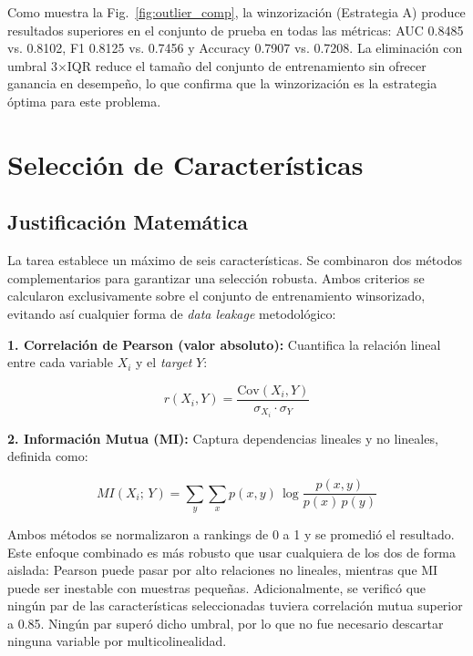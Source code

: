 \documentclass[conference]{IEEEtran}
\begin{document}
Como muestra la Fig.~\ref{fig:outlier_comp}, la winzorizaci\'{o}n (Estrategia A) produce resultados superiores en el conjunto de prueba en todas las m\'{e}tricas: AUC 0.8485 vs. 0.8102, F1 0.8125 vs. 0.7456 y Accuracy 0.7907 vs. 0.7208. La eliminaci\'{o}n con umbral 3$\times$IQR reduce el tama\~{n}o del conjunto de entrenamiento sin ofrecer ganancia en desempe\~{n}o, lo que confirma que la winzorizaci\'{o}n es la estrategia \'{o}ptima para este problema.

\section{Selecci\'{o}n de Caracter\'{i}sticas}

\subsection{Justificaci\'{o}n Matem\'{a}tica}

La tarea establece un m\'{a}ximo de seis caracter\'{i}sticas. Se combinaron dos m\'{e}todos complementarios para garantizar una selecci\'{o}n robusta. Ambos criterios se calcularon exclusivamente sobre el conjunto de entrenamiento winsorizado, evitando as\'{i} cualquier forma de \textit{data leakage} metodol\'{o}gico:

\textbf{1. Correlaci\'{o}n de Pearson (valor absoluto):} Cuantifica la relaci\'{o}n lineal entre cada variable $X_i$ y el \textit{target} $Y$:

\begin{equation}
  r(X_i, Y) = \frac{\text{Cov}(X_i, Y)}{\sigma_{X_i} \cdot \sigma_Y}
\end{equation}

\textbf{2. Informaci\'{o}n Mutua (MI):} Captura dependencias lineales y no lineales, definida como:

\begin{equation}
  MI(X_i;\, Y) = \sum_{y}\sum_{x} p(x,y)\,\log\frac{p(x,y)}{p(x)\,p(y)}
\end{equation}

Ambos m\'{e}todos se normalizaron a rankings de 0 a 1 y se promedi\'{o} el resultado. Este enfoque combinado es m\'{a}s robusto que usar cualquiera de los dos de forma aislada: Pearson puede pasar por alto relaciones no lineales, mientras que MI puede ser inestable con muestras peque\~{n}as. Adicionalmente, se verific\'{o} que ning\'{u}n par de las caracter\'{i}sticas seleccionadas tuviera correlaci\'{o}n mutua superior a 0.85. Ning\'{u}n par super\'{o} dicho umbral, por lo que no fue necesario descartar ninguna variable por multicolinealidad.
\end{document}
